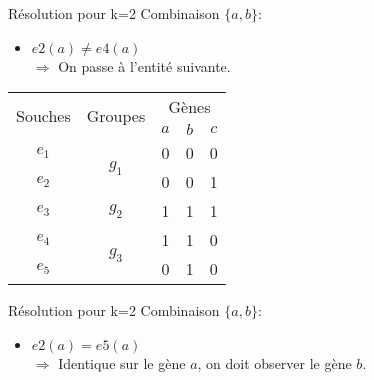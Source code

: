 \begin{overprint}
{\begin{minipage}[r]{0.46\linewidth}
				\begin{block}{Résolution pour k=2}
					Combinaison $\{a,b\}$:
					\begin{itemize}
						\item $e2(a) \not = e4(a) $ \\ $\Rightarrow$ On passe à l'entité suivante.
					\end{itemize}
				\end{block}
			\end{minipage}
		}
		{
			\begin{minipage}[l]{0.46\linewidth}
				\begin{center}
					\begin{tabular}{|c||c|c|c|c|}
						\hline
						\multirow{2}{*}{Souches}&\multirow{2}{*}{Groupes}&\multicolumn{3}{c|}{Gènes
						}\\
						&&\cellcolor{blue!75}$a$&\cellcolor{blue!75}$b$&$c$\\
						\hline
						\hline
						$e_1$&\multirow{2}{*}{$g_1$}& 0 & 0 & 0\\
						\cline{1-1} \cline{3-5}
						$e_2$&& \cellcolor{cyan}0 & 0 & 1\\
						\hline
						\hline
						$e_3$&$g_2$& 1 & 1 & 1\\
						\hline
						\hline
						$e_4$&\multirow{2}{*}{$g_3$}& 1 & 1 & 0\\
						\cline{1-1} \cline{3-5}
						$e_5$&& \cellcolor{cyan}0 & 1 & 0\\
						\hline
					\end{tabular}
				\end{center}
			\end{minipage}
			\hspace{0.6cm}
			\begin{minipage}[r]{0.46\linewidth}
				\begin{block}{Résolution pour k=2}
					Combinaison $\{a,b\}$:
					\begin{itemize}
						\item $e2(a) = e5(a) $ \\ $\Rightarrow$ Identique sur le gène $a$, on doit observer le gène $b$.
					\end{itemize}
				\end{block}
			\end{minipage}
		}
		{
			\begin{minipage}[l]{0.46\linewidth}
				\begin{center}
					\begin{tabular}{|c||c|c|c|c|}

\end{tabular}
\end{center}
\end{minipage}}
\end{overprint}
